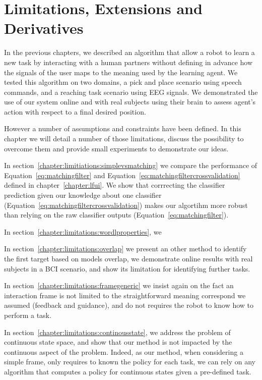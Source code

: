 
%
\chapter{Limitations, Extensions and Derivatives}
\label{chapter:limitations}
\minitoc


In the previous chapters, we described an algorithm that allow a robot to learn a new task by interacting with a human partners without defining in advance how the signals of the user maps to the meaning used by the learning agent. We tested this algorithm on two domains, a pick and place scenario using speech commands, and a reaching task scenario using EEG signals. We demonstrated the use of our system online and with real subjects using their brain to assess agent's action with respect to a final desired position.

However a number of assumptions and constraints have been defined. In this chapter we will detail a number of those limitations, discuss the possibility to overcome them and provide small experiments to demonstrate our ideas. 

In section~\ref{chapter:limitiations:simplevsmatching} we compare the performance of Equation~\ref{eq:matchingfilter} and Equation~\ref{eq:matchingfiltercrossvalidation} defined in chapter~\ref{chapter:lfui}. We show that corrrecting the classifier prediction given our knowledge about one classifier (Equation~\ref{eq:matchingfiltercrossvalidation}) makes our algortihm more robust than relying on the raw classifier outputs (Equation~\ref{eq:matchingfilter}).

In section~\ref{chapter:limitations:wordlproperties}, we 

In section~\ref{chapter:limitations:overlap} we present an other method to identify the first target based on models overlap, we demonstrate online results with real subjects in a BCI scenario, and show its limitation for identifying further tasks.

In section~\ref{chapter:limitations:framegeneric} we insist again on the fact an interaction frame is not limited to the straightforward meaning correspond we assumed (feedback and guidance), and do not requires the robot to know how to perform a task.

In section~\ref{chapter:limitations:continousstate}, we address the problem of continuous state space, and show that our method is not impacted by the continuous aspect of the problem. Indeed, as our method, when considering a simple frame, only requires to known the policy for each task, we can rely on any algorithm that computes a policy for continuous states given a pre-defined task.

